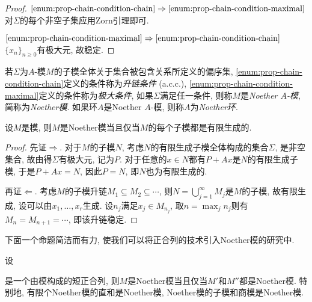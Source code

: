\begin{proof}
  $\ref{enum:prop-chain-condition-chain}\Rightarrow\ref{enum:prop-chain-condition-maximal}$ 对$\Sigma$的每个非空子集应用Zorn引理即可.

  $\ref{enum:prop-chain-condition-maximal}\Rightarrow\ref{enum:prop-chain-condition-chain}$ $\{x_n\}_{n\geq 0}$有极大元, 故稳定.
\end{proof}

\begin{definition}
  若$\Sigma$为$A$-模$M$的子模全体关于集合被包含关系所定义的偏序集, \ref{enum:prop-chain-condition-chain}定义的条件称为\emph{升链条件} (a.c.c.), \ref{enum:prop-chain-condition-maximal}定义的条件称为\emph{极大条件}, 如果$\Sigma$满足任一条件, 则称$M$是\emph{Noether $A$-模}, 简称为\emph{Noether模}. 如果环$A$是Noether $A$-模, 则称$A$为\emph{Noether环}.
\end{definition}

\begin{proposition}\label{prop:noethermodule}
  设$M$是模, 则$M$是Noether模当且仅当$M$的每个子模都是有限生成的.
\end{proposition}

\begin{proof}
  先证$\Rightarrow$. 对于$M$的子模$N$, 考虑$N$的有限生成子模全体构成的集合$\Sigma$, 是非空集合, 故由得$\Sigma$有极大元, 记为$P$. 对于任意的$x\in N$都有$P+Ax$是$N$的有限生成子模, 于是$P+Ax=N$, 因此$P=N$, 即$N$也为有限生成的.

  再证$\Leftarrow$. 考虑$M$的子模升链$M_1\subseteq M_2\subseteq \dotsb$, 则$N=\bigcup_{j=1}^\infty M_j$是$M$的子模, 故有限生成, 设可以由$x_1, \dotsc, x_r$生成. 设$n_j$满足$x_j\in M_{n_j}$, 取$n=\max_j n_j$则有$M_n=M_{n+1}=\dotsb$, 即该升链稳定.
\end{proof}

下面一个命题简洁而有力, 使我们可以将正合列的技术引入Noether模的研究中.

\begin{proposition}\label{prop:noethermoduleexactsequence}
  设
  是一个由模构成的短正合列, 则$M$是Noether模当且仅当$M'$和$M''$都是Noether模. 特别地, 有限个Noether模的直和是Noether模, Noether模的子模和商模是Noether模.
\end{proposition}

